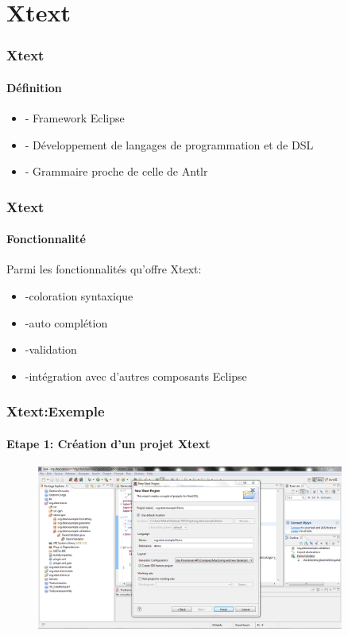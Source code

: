 \documentclass{beamer}
\begin{document}
\section{Xtext}
	
	 
	
	 
	\begin{frame}
	\frametitle{Xtext}\framesubtitle{Définition}
 \begin{itemize}
			\item - Framework Eclipse
			\item - Développement de langages de programmation et de DSL
			\item - Grammaire proche de celle de Antlr
\end{itemize}
\end{frame} 





	\begin{frame}
	\frametitle{Xtext}\framesubtitle{Fonctionnalité}
	Parmi les fonctionnalités qu’offre Xtext:
\begin{itemize}
	
			\item -coloration syntaxique
			\item -auto complétion 
			\item -validation
			\item -intégration avec d’autres composants Eclipse 
\end{itemize}
\end{frame} 



	\begin{frame}
	\frametitle{Xtext:Exemple}\framesubtitle{Etape 1: Création d'un projet Xtext}
	\begin{figure}[h]
	\centering
			\includegraphics[width=0.90\textwidth]{1.PNG}
	\label{fig:1}
\end{figure}

\end{frame} 
\end{document}
